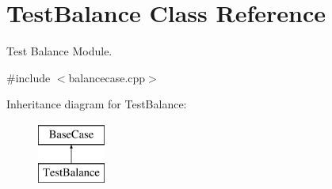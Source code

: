 \hypertarget{classTestBalance}{}\section{Test\+Balance Class Reference}
\label{classTestBalance}


Test Balance Module.  




{\ttfamily \#include $<$balancecase.\+cpp$>$}

Inheritance diagram for Test\+Balance\+:\begin{figure}[H]
\begin{center}
\leavevmode
\includegraphics[height=2.000000cm]{classTestBalance}
\end{center}
\end{figure}
